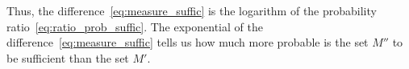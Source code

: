 \documentclass[\ifafour a4paper,12pt,\else a5paper,10pt,\fi%
onecolumn,oneside,article,%
british%
]{memoir}
\theoremstyle{remark}
\theoremstyle{innote}
\renewcommand*{\|}{\nonscript\,\vert\nonscript\;\mathopen{}}
\begin{document}
Thus, the difference~\eqref{eq:measure_suffic} is the logarithm of the
probability ratio~\eqref{eq:ratio_prob_suffic}. The exponential of the
difference~\eqref{eq:measure_suffic} tells us how much more probable is the
set $M''$ to be sufficient than the set $M'$.





\printbibliography[prenote=prenote%
]
\end{document}
